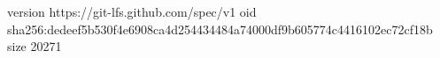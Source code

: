 version https://git-lfs.github.com/spec/v1
oid sha256:dedeef5b530f4e6908ca4d254434484a74000df9b605774c4416102ec72cf18b
size 20271
